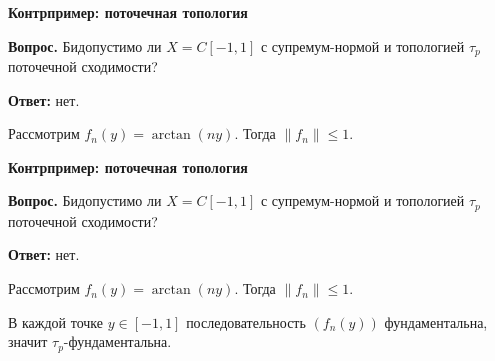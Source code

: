 \documentclass[11pt]{article}
\begin{document}
\begin{center}
{\color{notaeYELLOW}\bfseries\fontsize{44}{52}\selectfont Контрпример: поточечная топология}
\end{center}
\vspace*{\fill}
\begin{center}
\fontsize{36}{43}\selectfont
\parbox{\linewidth}{\centering\noindent \textbf{Вопрос.} Бидопустимо ли $X=C[-1,1]$ с супремум-нормой и топологией $\tau_p$ поточечной сходимости?
\par}\vspace{0.4in}
\parbox{\linewidth}{\centering\noindent \textbf{Ответ:} нет.
\par}\vspace{0.4in}
\parbox{\linewidth}{\centering\noindent Рассмотрим $f_n(y)=\arctan(ny)$. Тогда $\|f_n\|\le 1$.
\par}\vspace{0.4in}
\end{center}
\vspace*{\fill}

\newpage

\begin{center}
{\color{notaeYELLOW}\bfseries\fontsize{44}{52}\selectfont Контрпример: поточечная топология}
\end{center}
\vspace*{\fill}
\begin{center}
\fontsize{36}{43}\selectfont
\parbox{\linewidth}{\centering\noindent \textbf{Вопрос.} Бидопустимо ли $X=C[-1,1]$ с супремум-нормой и топологией $\tau_p$ поточечной сходимости?
\par}\vspace{0.4in}
\parbox{\linewidth}{\centering\noindent \textbf{Ответ:} нет.
\par}\vspace{0.4in}
\parbox{\linewidth}{\centering\noindent Рассмотрим $f_n(y)=\arctan(ny)$. Тогда $\|f_n\|\le 1$.
\par}\vspace{0.4in}
\parbox{\linewidth}{\centering\noindent В каждой точке $y\in[-1,1]$ последовательность $(f_n(y))$ фундаментальна, значит $\tau_p$-фундаментальна.
\par}\vspace{0.4in}
\end{center}
\vspace*{\fill}

\newpage
\end{document}
